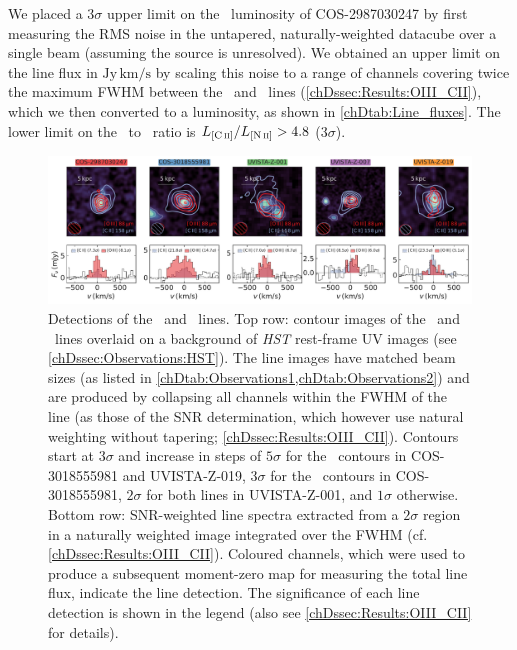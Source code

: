 We placed a $3 \sigma$ upper limit on the \NII\ luminosity of COS-2987030247 by first measuring the RMS noise in the untapered, naturally-weighted datacube over a single beam (assuming the source is unresolved). We obtained an upper limit on the line flux in $\mathrm{Jy \, km/s}$ by scaling this noise to a range of channels covering twice the maximum FWHM between the \OIIIf\ and \CII\ lines (\cref{chDssec:Results:OIII_CII}), which we then converted to a luminosity, as shown in \cref{chDtab:Line_fluxes}. The lower limit on the \CIILam\ to \NIILam\ ratio is $L_\CII/L_\NII > 4.8$ ($3 \sigma$).
\begin{figure}[t]
    \centering
    \includegraphics[width=\linewidth]{"Plots/ChapterD/Line_maps_spectra_clean_cube"}
    \caption[Detections of the \CII\ and \OIIIf\ lines.]{Detections of the \CIILam\ and \OIIILam\ lines. Top row: contour images of the \CII\ and \OIIIf\ lines overlaid on a background of \textit{HST} rest-frame UV images (see \cref{chDssec:Observations:HST}). The line images have matched beam sizes (as listed in \cref{chDtab:Observations1,chDtab:Observations2}) and are produced by collapsing all channels within the FWHM of the line (as those of the SNR determination, which however use natural weighting without tapering; \cref{chDssec:Results:OIII_CII}). Contours start at $3 \sigma$ and increase in steps of $5 \sigma$ for the \CII\ contours in COS-3018555981 and UVISTA-Z-019, $3 \sigma$ for the \OIIIf\ contours in COS-3018555981, $2 \sigma$ for both lines in UVISTA-Z-001, and $1 \sigma$ otherwise. Bottom row: SNR-weighted line spectra extracted from a $2 \sigma$ region in a naturally weighted image integrated over the FWHM (cf. \cref{chDssec:Results:OIII_CII}). Coloured channels, which were used to produce a subsequent moment-zero map for measuring the total line flux, indicate the line detection. The significance of each line detection is shown in the legend (also see \cref{chDssec:Results:OIII_CII} for details).
    }
    \label{chDfig:CII_and_OIII_maps_and_spectra}
\end{figure}

